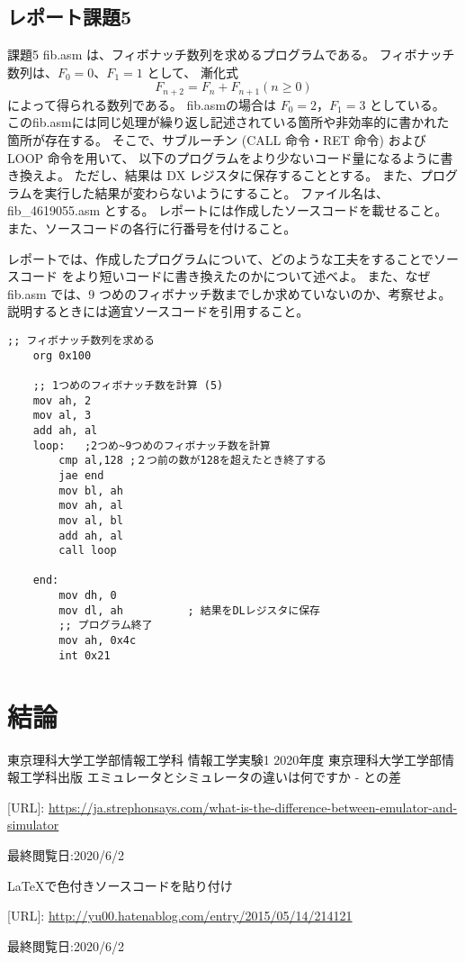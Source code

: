 \documentclass[12pt]{jarticle}
\begin{document}
\subsection{レポート課題5}
\begin{itembox}[l]{課題5}
	fib.asm は、フィボナッチ数列を求めるプログラムである。
	フィボナッチ数列は、$F_0 = 0$、$F_1 = 1$ として、
	漸化式
	$$F_{n+2} = F_n + F_{n+1}  (n \geq 0)$$
	によって得られる数列である。
	fib.asmの場合は $F_0 = 2$，$F_1 = 3$ としている。
	このfib.asmには同じ処理が繰り返し記述されている箇所や非効率的に書かれた箇所が存在する。
	そこで、サブルーチン (CALL 命令・RET 命令) および LOOP 命令を用いて、
	以下のプログラムをより少ないコード量になるように書き換えよ。
	ただし、結果は DX レジスタに保存することとする。
	また、プログラムを実行した結果が変わらないようにすること。
	ファイル名は、fib\_4619055.asm とする。
	レポートには作成したソースコードを載せること。
	また、ソースコードの各行に行番号を付けること。

	レポートでは、作成したプログラムについて、どのような工夫をすることでソースコード
	をより短いコードに書き換えたのかについて述べよ。
	また、なぜ fib.asm では、9 つめのフィボナッチ数までしか求めていないのか、考察せよ。
	説明するときには適宜ソースコードを引用すること。
\end{itembox}

\begin{lstlisting}[caption=fib\_4619055.asm,label=fib]
	;; フィボナッチ数列を求める
	org 0x100
	 
	;; 1つめのフィボナッチ数を計算 (5)
	mov ah, 2
	mov al, 3
	add ah, al
	loop:   ;2つめ~9つめのフィボナッチ数を計算
		cmp al,128 ;２つ前の数が128を超えたとき終了する
		jae end
		mov bl, ah
		mov ah, al
		mov al, bl
		add ah, al
		call loop
	 
	end:
		mov dh, 0
		mov dl, ah          ; 結果をDLレジスタに保存
		;; プログラム終了
		mov ah, 0x4c
		int 0x21
\end{lstlisting}


\section{結論}



\begin{thebibliography}{99}
	\label{sannkoubunnkenn_chapter}
	東京理科大学工学部情報工学科 情報工学実験1 2020年度
	東京理科大学工学部情報工学科出版
	エミュレータとシミュレータの違いは何ですか - との差

	[URL]: \url{https://ja.strephonsays.com/what-is-the-difference-between-emulator-and-simulator}

	最終閲覧日:2020/6/2

	\bibitem[3]{}LaTeXで色付きソースコードを貼り付け

	[URL]: \url{http://yu00.hatenablog.com/entry/2015/05/14/214121}

	最終閲覧日:2020/6/2


\end{thebibliography}

\clearpage
\appendix
\end{document}
